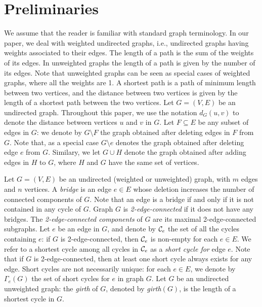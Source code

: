 \documentclass{article}
\newcommand{\dist}          {d}
\begin{document}
\section{Preliminaries}
\label{se:preliminary}

We assume that the reader is familiar with standard graph terminology.
In our paper, we deal with weighted undirected graphs, i.e., undirected graphs having weights associated to their edges. The length of a path is the sum of the weights of its edges. In unweighted graphs the length of a path is given by the number of its edges. Note that unweighted graphs can be seen as special cases of weighted graphs, where all the weights are 1.
A shortest path is a path of minimum length between two vertices, and the distance between two vertices is given by the length of a shortest path between the two vertices. Let $G=(V,E)$ be an undirected graph. Throughout this paper, we use the notation $\dist_G(u,v)$ to denote the distance between vertices $u$ and $v$ in $G$. Let $F\subseteq E$ be any subset of edges in $G$: we denote by $G\setminus F$ the graph obtained after deleting edges in $F$ from $G$. Note that, as a special case
$G\setminus e$ denotes the graph obtained after deleting edge $e$ from $G$. Similary,  we let  $G\cup H$ denote the graph obtained after adding edges in $H$ to $G$, where $H$ and $G$ have the same set of vertices. 

Let $G=(V,E)$ be an undirected 
(weighted or unweighted) graph, with $m$ edges and $n$ vertices. 
A \emph{bridge} is an edge  $e\in E$ whose deletion increases the number of connected components of $G$. 
Note that an edge is a bridge if and only if it is not contained in any cycle of $G$. Graph $G$ is \emph{2-edge-connected} if it does not have any bridges. The \emph{2-edge-connected components} of $G$ are its maximal 2-edge-connected subgraphs.
Let $e$ be an edge in $G$, and denote by  ${\cal C}_e$ 
the set of all the cycles containing $e$: if $G$ is 2-edge-connected, then ${\cal C}_e$ is non-empty for each $e\in E$.
We refer to a
shortest cycle among all cycles in ${\cal C}_e$ 
as a \emph{short cycle for} edge $e$.
Note that if $G$ is 2-edge-connected, then at least one short cycle 
always exists for any edge. Short cycles are not necessarily unique: for each $e\in E$, we denote by $\Gamma_{e}(G)$ the set of short cycles for $e$ in graph $G$.
Let $G$ be an undirected unweighted graph: the \emph{girth} of $G$, denoted by \emph{girth}$(G)$, is the length of a shortest cycle in $G$.
\end{document}
